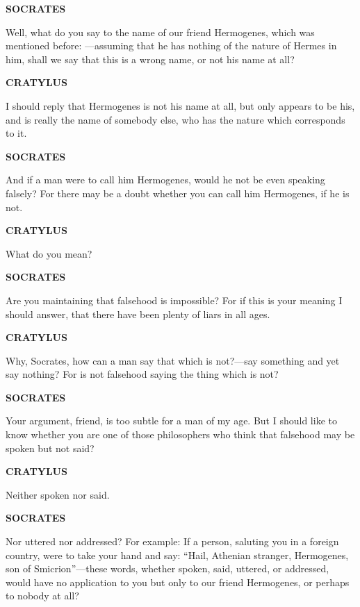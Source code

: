 \documentclass[11pt,letter]{article}
\begin{document}
\par \textbf{SOCRATES}
\par   Well, what do you say to the name of our friend Hermogenes, which was mentioned before: —assuming that he has nothing of the nature of Hermes in him, shall we say that this is a wrong name, or not his name at all?

\par \textbf{CRATYLUS}
\par   I should reply that Hermogenes is not his name at all, but only appears to be his, and is really the name of somebody else, who has the nature which corresponds to it.

\par \textbf{SOCRATES}
\par   And if a man were to call him Hermogenes, would he not be even speaking falsely? For there may be a doubt whether you can call him Hermogenes, if he is not.

\par \textbf{CRATYLUS}
\par   What do you mean?

\par \textbf{SOCRATES}
\par   Are you maintaining that falsehood is impossible? For if this is your meaning I should answer, that there have been plenty of liars in all ages.

\par \textbf{CRATYLUS}
\par   Why, Socrates, how can a man say that which is not?—say something and yet say nothing? For is not falsehood saying the thing which is not?

\par \textbf{SOCRATES}
\par   Your argument, friend, is too subtle for a man of my age. But I should like to know whether you are one of those philosophers who think that falsehood may be spoken but not said?

\par \textbf{CRATYLUS}
\par   Neither spoken nor said.

\par \textbf{SOCRATES}
\par   Nor uttered nor addressed? For example:  If a person, saluting you in a foreign country, were to take your hand and say:  “Hail, Athenian stranger, Hermogenes, son of Smicrion”—these words, whether spoken, said, uttered, or addressed, would have no application to you but only to our friend Hermogenes, or perhaps to nobody at all?
\end{document}

